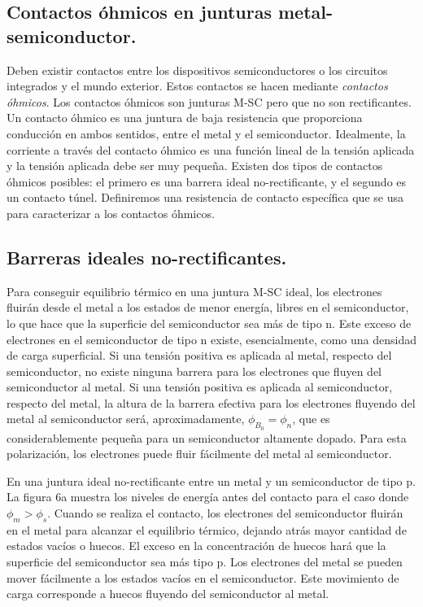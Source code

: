 \documentclass[oneside]{book}
\numberwithin{equation}{section}
\numberwithin{figure}{section}
\numberwithin{table}{section}
\begin{document}
		\subsection{Contactos óhmicos en junturas metal-semiconductor.}

			Deben existir contactos entre los dispositivos semiconductores o los circuitos integrados y el mundo exterior. Estos contactos se hacen mediante \emph{contactos óhmicos}. Los contactos óhmicos son junturas M-SC pero que no son rectificantes. Un contacto óhmico es una juntura de baja resistencia que proporciona conducción en ambos sentidos, entre el metal y el semiconductor. Idealmente, la corriente a través del contacto óhmico es una función lineal de la tensión aplicada y la tensión aplicada debe ser muy pequeña. Existen dos tipos de contactos óhmicos posibles: el primero es una barrera ideal no-rectificante, y el segundo es un contacto túnel. Definiremos una resistencia de contacto específica que se usa para caracterizar a los contactos óhmicos.

		\subsection{Barreras ideales no-rectificantes.}

			Para conseguir equilibrio térmico en una juntura M-SC ideal, los electrones fluirán desde el metal a los estados de menor energía, libres en el semiconductor, lo que hace que la superficie del semiconductor sea más de tipo n. Este exceso de electrones en el semiconductor de tipo n existe, esencialmente, como una densidad de carga superficial. Si una tensión positiva es aplicada al metal, respecto del semiconductor, no existe ninguna barrera para los electrones que fluyen del semiconductor al metal. Si una tensión positiva es aplicada al semiconductor, respecto del metal, la altura de la barrera efectiva para los electrones fluyendo del metal al semiconductor será, aproximadamente, $\phi_{B_0}=\phi_n$, que es considerablemente pequeña para un semiconductor altamente dopado. Para esta polarización, los electrones puede fluir fácilmente del metal al semiconductor.
			
			En una juntura ideal no-rectificante entre un metal y un semiconductor de tipo p. La figura 6a muestra los niveles de energía antes del contacto para el caso donde $\phi_m > \phi_s$. Cuando se realiza el contacto, los electrones del semiconductor fluirán en el metal para alcanzar el equilibrio térmico, dejando atrás mayor cantidad de estados vacíos o huecos. El exceso en la concentración de huecos hará que la superficie del semiconductor sea más tipo p. Los electrones del metal se pueden mover fácilmente a los estados vacíos en el semiconductor. Este movimiento de carga corresponde a huecos fluyendo del semiconductor al metal.
\end{document}
